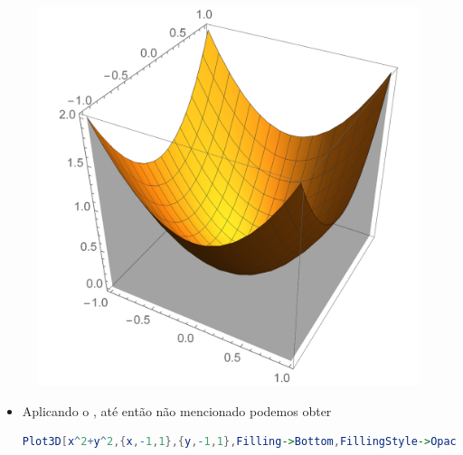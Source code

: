 \documentclass[a4paper, 12pt]{article}
\begin{document}
\begin{itemize}
\begin{itemize}
			\begin{figure}[!h]
				\centering
				\includegraphics[scale=.45]{images/Filling}
			\end{figure}
			
			\begin{itemize}
				\item Aplicando o , até então não mencionado podemos obter
\begin{lstlisting}[language=Mathematica]
Plot3D[x^2+y^2,{x,-1,1},{y,-1,1},Filling->Bottom,FillingStyle->Opacity[.8],PlotStyle->Red]
\end{lstlisting}


\end{itemize}
\end{itemize}
\end{itemize}
\end{document}
